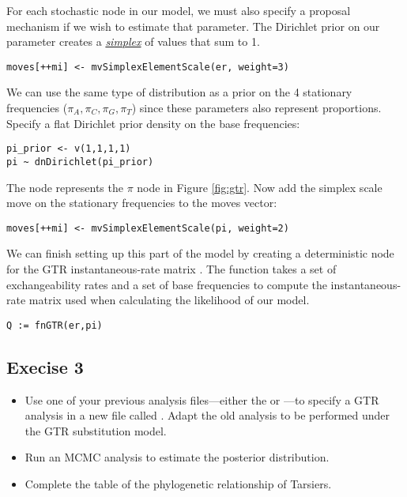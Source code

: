For each stochastic node in our model, we must also specify a proposal mechanism if we wish to estimate that parameter. 
The Dirichlet prior on our parameter  creates a \href{http://en.wikipedia.org/wiki/Simplex}{\textit{simplex}} of values that sum to 1. 

{\tt\small \begin{snugshade*}
\begin{lstlisting}
moves[++mi] <- mvSimplexElementScale(er, weight=3) 
\end{lstlisting}
\end{snugshade*}}

We can use the same type of distribution as a prior on the 4 stationary frequencies ($\pi_A, \pi_C, \pi_G, \pi_T$) since these parameters also represent proportions. 
Specify a flat Dirichlet prior density on the base frequencies:
{\tt \begin{snugshade*}
\begin{lstlisting}
pi_prior <- v(1,1,1,1) 
pi ~ dnDirichlet(pi_prior)
\end{lstlisting}
\end{snugshade*}}

The node  represents the $\pi$ node in Figure \ref{fig:gtr}.
Now add the simplex scale move on the stationary frequencies to the moves vector:
{\tt \small \begin{snugshade*}
\begin{lstlisting}
moves[++mi] <- mvSimplexElementScale(pi, weight=2)  
\end{lstlisting}
\end{snugshade*}}

We can finish setting up this part of the model by creating a deterministic node for the GTR instantaneous-rate matrix . 
The  function takes a set of exchangeability rates and a set of base frequencies to compute the instantaneous-rate matrix used when calculating the likelihood of our model.
{\tt \begin{snugshade*}
\begin{lstlisting}
Q := fnGTR(er,pi)
\end{lstlisting}
\end{snugshade*}}




\subsection{Execise 3}

\begin{itemize}
\item Use one of your previous analysis files---either the  or ---to specify a GTR analysis in a new file called .
	Adapt the old analysis to be performed under the GTR substitution model. 
\item Run an MCMC analysis to estimate the posterior distribution.
\item Complete the table of the phylogenetic relationship of Tarsiers.
\end{itemize}






